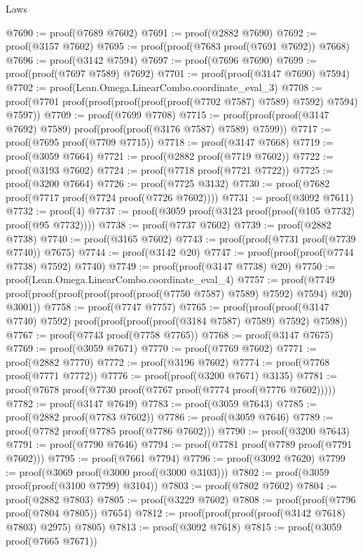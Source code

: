 \begin{lexlean}{Laws}
\begin{coremodule}
@7690 := proof(@7689 @7602)
@7691 := proof(@2882 @7690)
@7692 := proof(@3157 @7602)
@7695 := proof(proof(@7683 proof(@7691 @7692)) @7668)
@7696 := proof(@3142 @7594)
@7697 := proof(@7696 @7690)
@7699 := proof(proof(@7697 @7589) @7692)
@7701 := proof(proof(@3147 @7690) @7594)
@7702 := proof(Lean.Omega.LinearCombo.coordinate_eval_3)
@7708 := proof(@7701 proof(proof(proof(proof(proof(@7702 @7587) @7589) @7592) @7594) @7597))
@7709 := proof(@7699 @7708)
@7715 := proof(proof(proof(@3147 @7692) @7589) proof(proof(proof(@3176 @7587) @7589) @7599))
@7717 := proof(@7695 proof(@7709 @7715))
@7718 := proof(@3147 @7668)
@7719 := proof(@3059 @7664)
@7721 := proof(@2882 proof(@7719 @7602))
@7722 := proof(@3193 @7602)
@7724 := proof(@7718 proof(@7721 @7722))
@7725 := proof(@3200 @7664)
@7726 := proof(@7725 @3132)
@7730 := proof(@7682 proof(@7717 proof(@7724 proof(@7726 @7602))))
@7731 := proof(@3092 @7611)
@7732 := proof(4)
@7737 := proof(@3059 proof(@3123 proof(proof(@105 @7732) proof(@95 @7732))))
@7738 := proof(@7737 @7602)
@7739 := proof(@2882 @7738)
@7740 := proof(@3165 @7602)
@7743 := proof(proof(@7731 proof(@7739 @7740)) @7675)
@7744 := proof(@3142 @20)
@7747 := proof(proof(proof(@7744 @7738) @7592) @7740)
@7749 := proof(proof(@3147 @7738) @20)
@7750 := proof(Lean.Omega.LinearCombo.coordinate_eval_4)
@7757 := proof(@7749
      proof(proof(proof(proof(proof(proof(@7750 @7587) @7589) @7592) @7594) @20) @3001))
@7758 := proof(@7747 @7757)
@7765 := proof(proof(proof(@3147 @7740) @7592)
      proof(proof(proof(proof(@3184 @7587) @7589) @7592) @7598))
@7767 := proof(@7743 proof(@7758 @7765))
@7768 := proof(@3147 @7675)
@7769 := proof(@3059 @7671)
@7770 := proof(@7769 @7602)
@7771 := proof(@2882 @7770)
@7772 := proof(@3196 @7602)
@7774 := proof(@7768 proof(@7771 @7772))
@7776 := proof(proof(@3200 @7671) @3135)
@7781 := proof(@7678 proof(@7730 proof(@7767 proof(@7774 proof(@7776 @7602)))))
@7782 := proof(@3147 @7649)
@7783 := proof(@3059 @7643)
@7785 := proof(@2882 proof(@7783 @7602))
@7786 := proof(@3059 @7646)
@7789 := proof(@7782 proof(@7785 proof(@7786 @7602)))
@7790 := proof(@3200 @7643)
@7791 := proof(@7790 @7646)
@7794 := proof(@7781 proof(@7789 proof(@7791 @7602)))
@7795 := proof(@7661 @7794)
@7796 := proof(@3092 @7620)
@7799 := proof(@3069 proof(@3000 proof(@3000 @3103)))
@7802 := proof(@3059 proof(proof(@3100 @7799) @3104))
@7803 := proof(@7802 @7602)
@7804 := proof(@2882 @7803)
@7805 := proof(@3229 @7602)
@7808 := proof(proof(@7796 proof(@7804 @7805)) @7654)
@7812 := proof(proof(proof(proof(@3142 @7618) @7803) @2975) @7805)
@7813 := proof(@3092 @7618)
@7815 := proof(@3059 proof(@7665 @7671))

\end{coremodule}
\end{lexlean}
